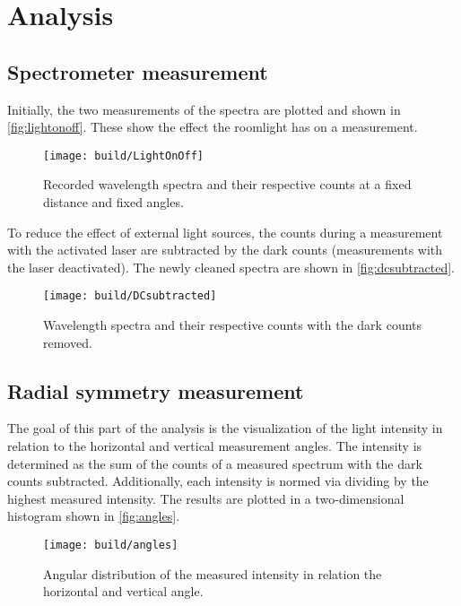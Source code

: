 \newpage
\section{Analysis}
\label{sec:Analysis}

\subsection{Spectrometer measurement}

Initially, the two measurements of the spectra are plotted and shown in \autoref{fig:lightonoff}. 
These show the effect the roomlight has on a measurement.

\begin{figure}[H]
	\centering
	\texttt{[image: build/LightOnOff]}
	\caption{Recorded wavelength spectra and their respective counts at a fixed distance and fixed angles.}
	\label{fig:lightonoff}
\end{figure}

To reduce the effect of external light sources, the counts during a measurement with the activated laser are subtracted by the
dark counts (measurements with the laser deactivated). The newly cleaned spectra are shown in \autoref{fig:dcsubtracted}.

\begin{figure}[H]
	\centering
	\texttt{[image: build/DCsubtracted]}
	\caption{Wavelength spectra and their respective counts with the dark counts removed.}
	\label{fig:dcsubtracted}
\end{figure}

\subsection{Radial symmetry measurement}
The goal of this part of the analysis is the visualization of the light intensity in relation to the horizontal and vertical measurement angles.
The intensity is determined as the sum of the counts of a measured spectrum with the dark counts subtracted. 
Additionally, each intensity is normed via dividing by the highest measured intensity.
The results are plotted in a two-dimensional histogram shown in \autoref{fig:angles}.

\begin{figure}[H]
	\centering
	\texttt{[image: build/angles]}
	\caption{Angular distribution of the measured intensity in relation the horizontal and vertical angle.}
	\label{fig:angles}
\end{figure}

